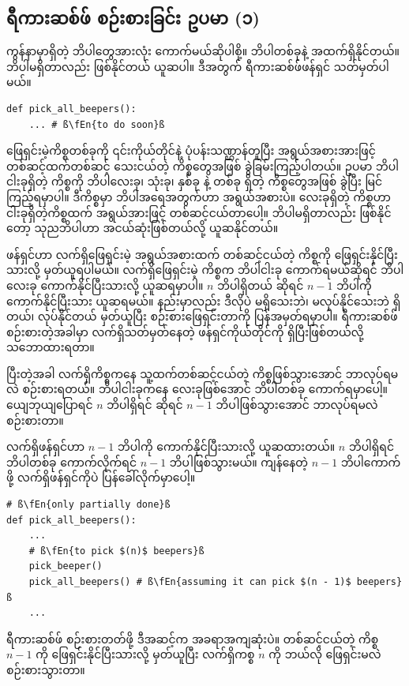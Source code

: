 \subsection*{ရီကားဆစ်ဖ် စဉ်းစားခြင်း ဥပမာ (၁)}
ကွန်နာမှာရှိတဲ့ ဘိပါတွေအားလုံး ကောက်မယ်ဆိုပါစို့။ ဘိပါတစ်ခုနဲ့ အထက်ရှိနိုင်တယ်။ ဘိပါမရှိတာလည်း ဖြစ်နိုင်တယ် ယူဆပါ။ ဒီအတွက် ရီကားဆစ်ဖ်ဖန်ရှင် သတ်မှတ်ပါမယ်။ 
%
\setlength{\fboxsep}{0pt}
\begin{verbatim}
def pick_all_beepers():
    ... # ß\fEn{to do soon}ß
\end{verbatim}
%

ဖြေရှင်းမဲ့ကိစ္စတစ်ခုကို ၎င်းကိုယ်တိုင်နဲ့ ပုံပန်းသဏ္ဌာန်တူပြီး အရွယ်အစားအားဖြင့် တစ်ဆင့်ထက်တစ်ဆင့် သေးငယ်တဲ့ ကိစ္စတွေအဖြစ် ခွဲခြမ်းကြည့်ပါတယ်။ ဥပမာ ဘိပါငါးခုရှိတဲ့ ကိစ္စကို ဘိပါလေးခု၊ သုံးခု၊ နှစ်ခု နဲ့ တစ်ခု ရှိတဲ့ ကိစ္စတွေအဖြစ် ခွဲပြီး မြင်ကြည့်ရမှာပါ။ ဒီကိစ္စမှာ ဘိပါအရေအတွက်ဟာ အရွယ်အစားပဲ။ လေးခုရှိတဲ့ ကိစ္စဟာ ငါးခုရှိတဲ့ကိစ္စထက် အရွယ်အားဖြင့် တစ်ဆင့်ငယ်တာပေါ့။ ဘိပါမရှိတာလည်း ဖြစ်နိုင်တော့ သုညဘိပါဟာ အငယ်ဆုံးဖြစ်တယ်လို့ ယူဆနိုင်တယ်။

 ဖန်ရှင်ဟာ လက်ရှိဖြေရှင်းမဲ့ အရွယ်အစားထက် တစ်ဆင့်ငယ်တဲ့ ကိစ္စကို ဖြေရှင်းနိုင်ပြီးသားလို့ မှတ်ယူရပါမယ်။ လက်ရှိဖြေရှင်းမဲ့ ကိစ္စက ဘိပါငါးခု ကောက်ရမယ်ဆိုရင် ဘိပါလေးခု ကောက်နိုင်ပြီးသားလို့ ယူဆရမှာပါ။ $n$ ဘိပါရှိတယ် ဆိုရင် $n - 1$ ဘိပါကို ကောက်နိုင်ပြီးသား ယူဆရမယ်။  နည်းမှာလည်း ဒီလိုပဲ မရှိသေးဘဲ၊ မလုပ်နိုင်သေးဘဲ ရှိတယ်၊ လုပ်နိုင်တယ် မှတ်ယူပြီး စဉ်းစားဖြေရှင်းတာကို ပြန်အမှတ်ရမှာပါ။ ရီကားဆစ်ဖ် စဉ်းစားတဲ့အခါမှာ လက်ရှိသတ်မှတ်နေတဲ့ ဖန်ရှင်ကိုယ်တိုင်ကို ရှိပြီးဖြစ်တယ်လို့ သဘောထားရတာ။

ပြီးတဲ့အခါ လက်ရှိကိစ္စကနေ သူ့ထက်တစ်ဆင့်ငယ်တဲ့ ကိစ္စဖြစ်သွားအောင် ဘာလုပ်ရမလဲ စဉ်းစားရတယ်။ ဘိပါငါးခုကနေ လေးခုဖြစ်အောင် ဘိပါတစ်ခု ကောက်ရမှာပေါ့။ ယျေဘုယျပြောရင် $n$ ဘိပါရှိရင် ဆိုရင် $n - 1$ ဘိပါဖြစ်သွားအောင် ဘာလုပ်ရမလဲ စဉ်းစားတာ။

လက်ရှိဖန်ရှင်ဟာ $n - 1$ ဘိပါကို ကောက်နိုင်ပြီးသားလို့ ယူဆထားတယ်။  $n$ ဘိပါရှိရင် ဘိပါတစ်ခု ကောက်လိုက်ရင် $n - 1$ ဘိပါဖြစ်သွားမယ်။  ကျန်နေတဲ့  $n - 1$ ဘိပါကောက်ဖို့ လက်ရှိဖန်ရှင်ကိုပဲ ပြန်ခေါ်လိုက်မှာပေါ့။
%
\setlength{\fboxsep}{0pt}
\begin{verbatim}
# ß\fEn{only partially done}ß
def pick_all_beepers():
    ...
    # ß\fEn{to pick $(n)$ beepers}ß
    pick_beeper()
    pick_all_beepers() # ß\fEn{assuming it can pick $(n - 1)$ beepers}ß
    ...
\end{verbatim}
%
ရီကားဆစ်ဖ် စဉ်းစားတတ်ဖို့ ဒီအဆင့်က အခရာအကျဆုံးပဲ။ တစ်ဆင့်ငယ်တဲ့ ကိစ္စ $n - 1$ ကို ဖြေရှင်းနိုင်ပြီးသားလို့ မှတ်ယူပြီး လက်ရှိကစ္စ $n$ ကို ဘယ်လို ဖြေရှင်းမလဲ စဉ်းစားသွားတာ။

